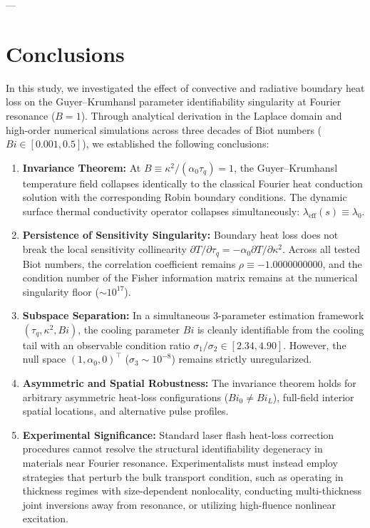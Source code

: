 \documentclass[review,12pt]{article}
\begin{document}
---

\section{Conclusions}

In this study, we investigated the effect of convective and radiative boundary heat loss on the Guyer--Krumhansl parameter identifiability singularity at Fourier resonance ($B = 1$). Through analytical derivation in the Laplace domain and high-order numerical simulations across three decades of Biot numbers ($Bi \in [0.001, 0.5]$), we established the following conclusions:
\begin{enumerate}
    \item \textbf{Invariance Theorem:} At $B \equiv \kappa^2 / (\alpha_0 \tau_q) = 1$, the Guyer--Krumhansl temperature field collapses identically to the classical Fourier heat conduction solution with the corresponding Robin boundary conditions. The dynamic surface thermal conductivity operator collapses simultaneously: $\lambda_{\mathrm{eff}}(s) \equiv \lambda_0$.
    \item \textbf{Persistence of Sensitivity Singularity:} Boundary heat loss does not break the local sensitivity collinearity $\partial T / \partial \tau_q = -\alpha_0 \partial T / \partial \kappa^2$. Across all tested Biot numbers, the correlation coefficient remains $\rho \equiv -1.0000000000$, and the condition number of the Fisher information matrix remains at the numerical singularity floor ($\sim 10^{17}$).
    \item \textbf{Subspace Separation:} In a simultaneous 3-parameter estimation framework $(\tau_q, \kappa^2, Bi)$, the cooling parameter $Bi$ is cleanly identifiable from the cooling tail with an observable condition ratio $\sigma_1 / \sigma_2 \in [2.34, 4.90]$. However, the null space $(1, \alpha_0, 0)^\top$ ($\sigma_3 \sim 10^{-8}$) remains strictly unregularized.
    \item \textbf{Asymmetric and Spatial Robustness:} The invariance theorem holds for arbitrary asymmetric heat-loss configurations ($Bi_0 \ne Bi_L$), full-field interior spatial locations, and alternative pulse profiles.
    \item \textbf{Experimental Significance:} Standard laser flash heat-loss correction procedures cannot resolve the structural identifiability degeneracy in materials near Fourier resonance. Experimentalists must instead employ strategies that perturb the bulk transport condition, such as operating in thickness regimes with size-dependent nonlocality, conducting multi-thickness joint inversions away from resonance, or utilizing high-fluence nonlinear excitation.
\end{enumerate}
\end{document}

